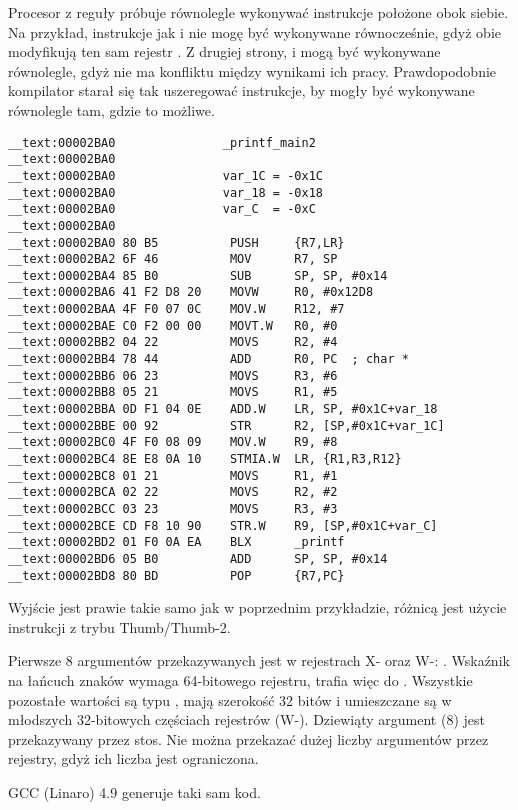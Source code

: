 Procesor z reguły próbuje równolegle wykonywać instrukcje położone obok siebie. Na przykład, instrukcje jak  i
 nie mogę być wykonywane równocześnie, gdyż obie modyfikują ten sam rejestr .
Z drugiej strony,  i 
mogą być wykonywane równolegle, gdyż nie ma konfliktu między wynikami ich pracy.
Prawdopodobnie kompilator starał się tak uszeregować instrukcje, by mogły być wykonywane równolegle tam, gdzie to możliwe.
 
\myparagraph{\OptimizingXcodeIV: \ThumbTwoMode}

\begin{lstlisting}[style=customasmARM]
__text:00002BA0               _printf_main2
__text:00002BA0
__text:00002BA0               var_1C = -0x1C
__text:00002BA0               var_18 = -0x18
__text:00002BA0               var_C  = -0xC
__text:00002BA0
__text:00002BA0 80 B5          PUSH     {R7,LR}
__text:00002BA2 6F 46          MOV      R7, SP
__text:00002BA4 85 B0          SUB      SP, SP, #0x14
__text:00002BA6 41 F2 D8 20    MOVW     R0, #0x12D8
__text:00002BAA 4F F0 07 0C    MOV.W    R12, #7
__text:00002BAE C0 F2 00 00    MOVT.W   R0, #0
__text:00002BB2 04 22          MOVS     R2, #4
__text:00002BB4 78 44          ADD      R0, PC  ; char *
__text:00002BB6 06 23          MOVS     R3, #6
__text:00002BB8 05 21          MOVS     R1, #5
__text:00002BBA 0D F1 04 0E    ADD.W    LR, SP, #0x1C+var_18
__text:00002BBE 00 92          STR      R2, [SP,#0x1C+var_1C]
__text:00002BC0 4F F0 08 09    MOV.W    R9, #8
__text:00002BC4 8E E8 0A 10    STMIA.W  LR, {R1,R3,R12}
__text:00002BC8 01 21          MOVS     R1, #1
__text:00002BCA 02 22          MOVS     R2, #2
__text:00002BCC 03 23          MOVS     R3, #3
__text:00002BCE CD F8 10 90    STR.W    R9, [SP,#0x1C+var_C]
__text:00002BD2 01 F0 0A EA    BLX      _printf
__text:00002BD6 05 B0          ADD      SP, SP, #0x14
__text:00002BD8 80 BD          POP      {R7,PC}
\end{lstlisting}

Wyjście jest prawie takie samo jak w poprzednim przykładzie, różnicą jest użycie instrukcji z trybu Thumb/Thumb-2.





Pierwsze 8 argumentów przekazywanych jest w rejestrach X- oraz W-: \ARMPCS.
Wskaźnik na łańcuch znaków wymaga 64-bitowego rejestru, trafia więc do .
Wszystkie pozostałe wartości są typu \Tint, mają szerokość 32 bitów i umieszczane są w młodszych 32-bitowych częściach rejestrów (W-).
Dziewiąty argument (8) jest przekazywany przez stos.
Nie można przekazać dużej liczby argumentów przez rejestry, gdyż ich liczba jest ograniczona.

\Optimizing GCC (Linaro) 4.9 generuje taki sam kod.
